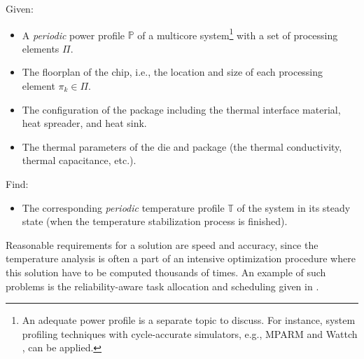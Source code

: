 Given:
\begin{itemize}
  \item A \emph{periodic} power profile $\mathbb{P}$ of a multicore system\footnote{An adequate power profile is a separate topic to discuss. For instance, system profiling techniques with cycle-accurate simulators, e.g., MPARM \cite{benini2005} and Wattch \cite{brooks2000}, can be applied.} with a set of processing elements $\Pi$.
  \item The floorplan of the chip, i.e., the location and size of each processing element $\pi_k \in \Pi$.
  \item The configuration of the package including the thermal interface material, heat spreader, and heat sink.
  \item The thermal parameters of the die and package (the thermal conductivity, thermal capacitance, etc.).
\end{itemize}

Find:
\begin{itemize}
  \item The corresponding \emph{periodic} temperature profile $\mathbb{T}$ of the system in its steady state (when the temperature stabilization process is finished).
\end{itemize}

Reasonable requirements for a solution are speed and accuracy, since the temperature analysis is often a part of an intensive optimization procedure where this solution have to be computed thousands of times. An example of such problems is the reliability-aware task allocation and scheduling given in .
